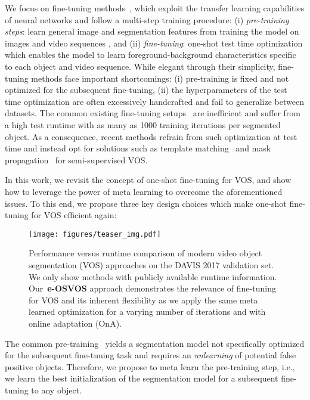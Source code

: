 \documentclass{article}
\begin{document}
    We focus on fine-tuning methods~\cite{OSVOS,OSVOS-S,MVOS,premvos,onavos}, which exploit the transfer learning capabilities of neural networks and follow a multi-step training procedure: (i) {\it pre-training steps}: learn general image and segmentation features from training the model on images and video sequences , and (ii) {\it fine-tuning}: one-shot test time optimization which enables the model to learn foreground-background characteristics specific to each object and video sequence.
While elegant through their simplicity, fine-tuning methods face important shortcomings: (i) pre-training is fixed and not optimized for the subsequent fine-tuning, (ii) the hyperparameters of the test time optimization are often excessively handcrafted and fail to generalize between datasets.
The common existing fine-tuning setups~\cite{OSVOS,premvos} are inefficient and suffer from a high test runtime with as many as 1000 training iterations per segmented object.
As a consequence, recent methods refrain from such optimization at test time and instead opt for solutions such as template matching~\cite{BlazinglyFV,VideoMatch} and mask propagation~\cite{Cheng_favos_2018,Cheng_ICCV_2017,oh2018fast,Perazzi2017,8325298,Yang2018EfficientVO} for semi-supervised VOS.


    In this work, we revisit the concept of one-shot fine-tuning for VOS, and show how to leverage the power of meta learning to overcome the aforementioned issues.
To this end, we propose three key design choices which make one-shot fine-tuning for VOS efficient again:



    \begin{figure}[t]
    \centering

    \texttt{[image: figures/teaser\_img.pdf]}


    \caption{Performance versus runtime comparison of modern video object segmentation (VOS) approaches on the DAVIS 2017 validation set.
We only show methods with publicly available runtime information.
Our~\textbf{e-OSVOS} approach demonstrates the relevance of fine-tuning for VOS and its inherent flexibility as we apply the same meta learned optimization for a varying number of iterations and with online adaptation (OnA).
}
    \label{fig:teaser}
\end{figure} 
The common pre-training~\cite{OSVOS,OSVOS-S,premvos,onavos} yields a segmentation model not specifically optimized for the subsequent fine-tuning task and requires an \textit{unlearning} of potential false positive objects.
Therefore, we propose to meta learn the pre-training step, i.e., we learn the best initialization of the segmentation model for a subsequent fine-tuning to any object.
\end{document}
